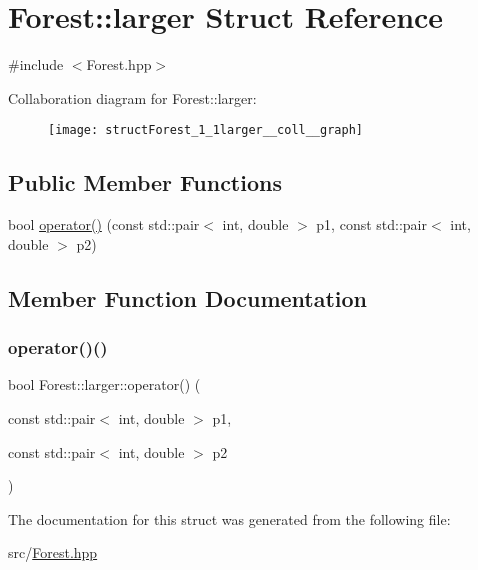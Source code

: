 \hypertarget{structForest_1_1larger}{}\section{Forest\+:\+:larger Struct Reference}
\label{structForest_1_1larger}


{\ttfamily \#include $<$Forest.\+hpp$>$}



Collaboration diagram for Forest\+:\+:larger\+:\nopagebreak
\begin{figure}[H]
\begin{center}
\leavevmode
\texttt{[image: structForest\_1\_1larger\_\_coll\_\_graph]}
\end{center}
\end{figure}
\subsection*{Public Member Functions}
\begin{DoxyCompactItemize}
\item 
bool \hyperlink{structForest_1_1larger_a9c11ad031d639515e945e085de4448a4}{operator()} (const std\+::pair$<$ int, double $>$ p1, const std\+::pair$<$ int, double $>$ p2)
\end{DoxyCompactItemize}


\subsection{Member Function Documentation}
\mbox{\label{structForest_1_1larger_a9c11ad031d639515e945e085de4448a4}} 
\subsubsection{\texorpdfstring{operator()()}{operator()()}}
{\footnotesize\ttfamily bool Forest\+::larger\+::operator() (\begin{DoxyParamCaption}\item[{const std\+::pair$<$ int, double $>$}]{p1,  }\item[{const std\+::pair$<$ int, double $>$}]{p2 }\end{DoxyParamCaption})\hspace{0.3cm}{\ttfamily [inline]}}



The documentation for this struct was generated from the following file\+:\begin{DoxyCompactItemize}
\item 
src/\hyperlink{Forest_8hpp}{Forest.\+hpp}\end{DoxyCompactItemize}
